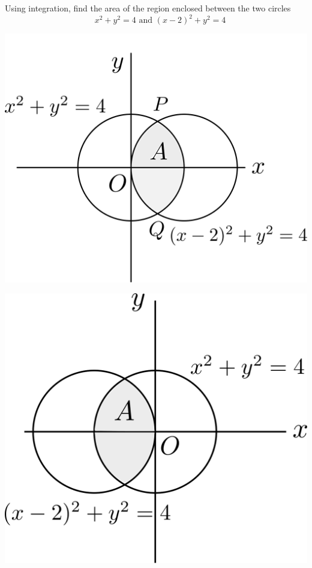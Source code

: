 \documentclass[14pt,fleqn]{extarticle}
\begin{document}
Using integration, find the area of the region 
enclosed between the two circles 
\[ \quad x^2+y^2=4\text{ and } (x-2)^2 + y^2 = 4 \]
%

\newcard

\begin{center}
\includegraphics[scale=0.35]{img_right.svg} 
\end{center} 

\newcard

\begin{center}
\includegraphics[scale=0.35]{img_wrong.svg} 
\end{center} 
\end{document}

